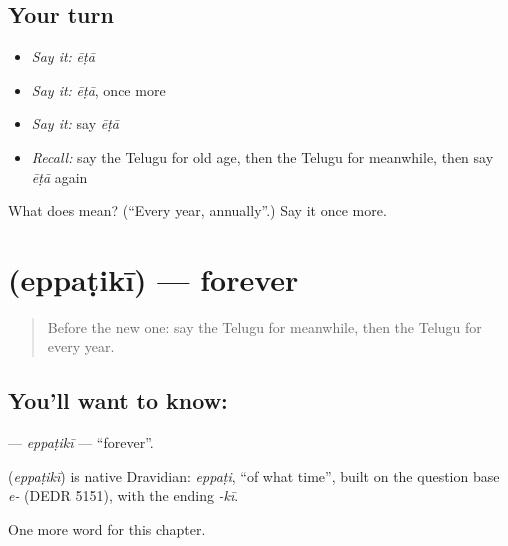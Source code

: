 \subsection*{Your turn}
\begin{itemize}
\raggedright
  \item \emph{Say it:} \emph{ēṭā}
  \item \emph{Say it:} \emph{ēṭā}, once more
  \item \emph{Say it:} say \emph{ēṭā}
  \item \emph{Recall:} say the Telugu for old age, then the Telugu for meanwhile, then say \emph{ēṭā} again
\end{itemize}

\begin{tcolorbox}[breakable,colback=teal!4,colframe=teal!35!black,title={Before you move on}]
What does  mean? (\textquotedblleft{}Every year, annually\textquotedblright{}.) Say it once more.
\end{tcolorbox}
\section[\texorpdfstring{\te{ఎప్పటికీ} (eppaṭikī)}{ఎప్పటికీ (eppaṭikī)}]{ (eppaṭikī) — forever}

\label{lesson:TE-C172-eppatiki}



\begin{quote}
Before the new one: say the Telugu for meanwhile, then the Telugu for every year.
\end{quote}

\subsection*{You'll want to know: }
\textbf{} — \emph{eppaṭikī} — \textquotedblleft{}forever\textquotedblright{}.

\begin{cousinweb}
\textbf{} (\emph{eppaṭikī}) is native Dravidian: \emph{eppaṭi}, \textquotedblleft{}of what time\textquotedblright{}, built on the question base \emph{e-} (DEDR 5151), with the ending \emph{-kī}.
\end{cousinweb}

\begin{grammarlens}[title={What you've built}]
One more word for this chapter.
\end{grammarlens}


